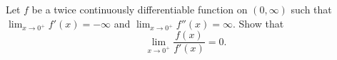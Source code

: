 Let \(f\) be a twice continuously differentiable function on \((0,\infty)\) such that
\(\lim_{x \to 0^{+}}f'(x)=-\infty\) and \(\lim_{x \to 0^{+}}f''(x)=\infty\). Show that
\[\lim_{x\to 0^{+}}\frac{f(x)}{f'(x)}=0.\]